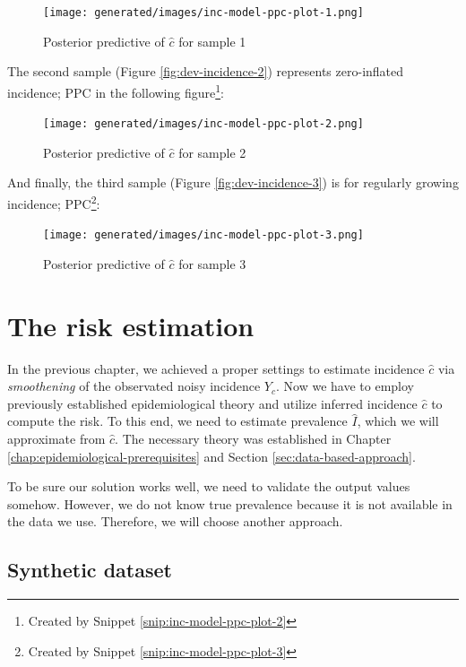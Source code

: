 \documentclass[
  digital, %
  oneside, %
  lof,     %
  lot,     %
]{fithesis4}
\begin{document}
\begin{figure}[H]
  \centering
  \texttt{[image: generated/images/inc-model-ppc-plot-1.png]}
  \caption{Posterior predictive of $\hat{c}$ for sample 1}
  \label{fig:incidence-posterior-1}
\end{figure}

The second sample (Figure \ref{fig:dev-incidence-2}) represents zero-inflated incidence; PPC in the following figure\footnote{Created by Snippet \ref{snip:inc-model-ppc-plot-2}}:

\begin{figure}[H]
  \centering
  \texttt{[image: generated/images/inc-model-ppc-plot-2.png]}
  \caption{Posterior predictive of $\hat{c}$ for sample 2}
  \label{fig:incidence-posterior-2}
\end{figure}

\newpage
And finally, the third sample (Figure \ref{fig:dev-incidence-3}) is for regularly growing incidence; PPC\footnote{Created by Snippet \ref{snip:inc-model-ppc-plot-3}}:

\begin{figure}[H]
  \centering
  \texttt{[image: generated/images/inc-model-ppc-plot-3.png]}
  \caption{Posterior predictive of $\hat{c}$ for sample 3}
  \label{fig:incidence-posterior-3}
\end{figure}


\chapter{The risk estimation}

In the previous chapter, we achieved a proper settings to estimate incidence $\hat{c}$ via \textit{smoothening} of the observated noisy incidence $Y_c$.
Now we have to employ previously established epidemiological theory and utilize inferred incidence $\hat{c}$ to compute the risk.
To this end, we need to estimate prevalence $\hat{I}$, which we will approximate from $\hat{c}$.
The necessary theory was established in Chapter \ref{chap:epidemiological-prerequisites} and Section \ref{sec:data-based-approach}.

To be sure our solution works well, we need to validate the output values somehow. However, we do not know true prevalence because it is not available in the data we use.
Therefore, we will choose another approach.


\section{Synthetic dataset}
\end{document}

